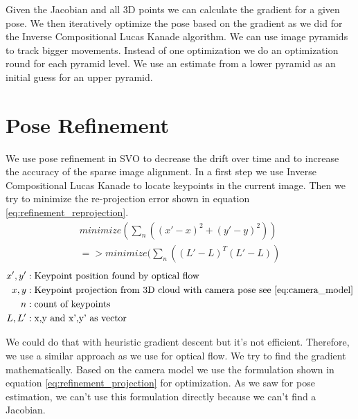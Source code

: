\documentclass[11pt,a4paper,titlepage,oneside]{report}
\begin{document}
Given the Jacobian and all 3D points we can calculate the gradient for a given pose. We then iteratively optimize the pose based on the gradient as we did for the Inverse Compositional Lucas Kanade algorithm. We can use image pyramids to track bigger movements. Instead of one optimization we do an optimization round for each pyramid level. We use an estimate from a lower pyramid as an initial guess for an upper pyramid.

\chapter{Pose Refinement}\label{ch:pose_refinement}

We use pose refinement in SVO to decrease the drift over time and to increase the accuracy of the sparse image alignment. In a first step we use Inverse Compositional Lucas Kanade to locate keypoints in the current image. Then we try to minimize the re-projection error shown in equation \ref{eq:refinement_reprojection}.
\begin{equation}\label{eq:refinement_reprojection}
  \begin{gathered}
    minimize(\sum_n ((x'-x)^2+(y'-y)^2))\\
    =>minimize(\sum_n ((L'-L)^T(L'-L))
  \end{gathered}
\end{equation}
\begin{align*}
  x',y'   &: \text{Keypoint position found by optical flow}\\
  x,y     &: \text{Keypoint projection from 3D cloud with camera pose see \ref{eq:camera_model}}\\
  n       &: \text{count of keypoints}\\
  L,L'    &: \text{x,y and x',y' as vector}
\end{align*}

We could do that with heuristic gradient descent but it's not efficient. Therefore, we use a similar approach as we use for optical flow. We try to find the gradient mathematically. Based on the camera model we use the formulation shown in equation \ref{eq:refinement_projection} for optimization. As we saw for pose estimation, we can't use this formulation directly because we can't find a Jacobian.
\end{document}

